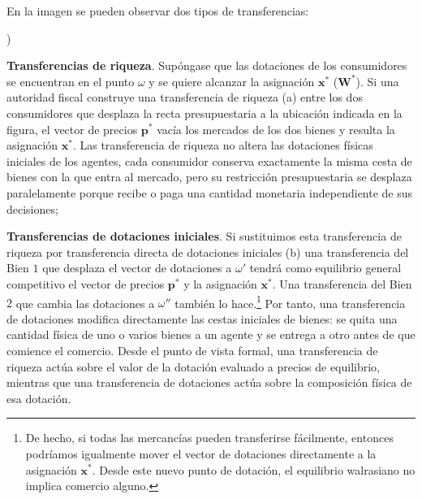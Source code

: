 \documentclass[10pt,a4paper]{article}
\newcounter{alphaitem}
\newenvironment{la}
      {\begin{list}{\alph{alphaitem})}{%
          \usecounter{alphaitem}%
          \setlength{\leftmargin}{1cm}%
          \setlength{\parskip}{3pt}%
          \setlength{\itemsep}{0pt}%
          \setlength{\parsep}{0pt}%
      }}
      {\end{list}}
\begin{document}
En la imagen se pueden observar dos tipos de transferencias:
\begin{la}
    \item \textbf{Transferencias de riqueza}. Supóngase que las dotaciones de los consumidores se encuentran en el punto $\omega$ y se quiere alcanzar la asignación $\mathbf x^*$ ($\mathbf W^*$). Si una autoridad fiscal construye una transferencia de riqueza (a) entre los dos consumidores que desplaza la recta presupuestaria a la ubicación indicada en la figura, el vector de precios $\mathbf p^*$ vacía los mercados de los dos bienes y resulta la asignación $\mathbf x^*$.  Las transferencia de riqueza no altera las dotaciones físicas iniciales de los agentes, cada consumidor conserva exactamente la misma cesta de bienes con la que entra al mercado, pero su restricción presupuestaria se desplaza paralelamente porque recibe o paga una cantidad monetaria independiente de sus decisiones;
    \item \textbf{Transferencias de dotaciones iniciales}. Si sustituimos esta transferencia de riqueza por transferencia directa de dotaciones iniciales (b) una transferencia del Bien $1$ que desplaza el vector de dotaciones a $\omega'$ tendrá como equilibrio general competitivo el vector de precios $\mathbf p^*$ y la asignación $\mathbf x^*$. Una transferencia del Bien $2$ que cambia las dotaciones a $\omega''$ también lo hace.\footnote{%
        De hecho, si todas las mercancías pueden transferirse fácilmente, entonces podríamos igualmente mover el vector de dotaciones directamente a la asignación $\mathbf x^*$. Desde este nuevo punto de dotación, el equilibrio walrasiano no implica comercio alguno.
    } Por tanto, una transferencia de dotaciones modifica directamente las cestas iniciales de bienes: se quita una cantidad física de uno o varios bienes a un agente y se entrega a otro antes de que comience el comercio. Desde el punto de vista formal, una transferencia de riqueza actúa sobre el valor de la dotación evaluado a precios de equilibrio, mientras que una transferencia de dotaciones actúa sobre la composición física de esa dotación.
\end{la}
\end{document}
